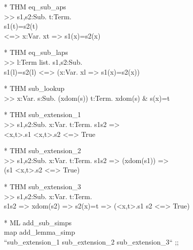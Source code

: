 \begin{prl*}
\>* THM eq\_sub\_aps\\
\>  >> \mforall{}s1,s2:Sub. \mforall{}t:Term. \\
\>      s1(t)=s2(t)\\
\>      <=> \mforall{}x:Var. x\mepsilon{}t => s1(x)=s2(x)
\end{prl*}

\begin{prl*}
\>* THM eq\_sub\_laps\\
\>  >> \mforall{}l:Term list. \mforall{}s1,s2:Sub. \\
\>        s1(l)=s2(l) <=> (\mforall{}x:Var. x\mepsilon{}l => s1(x)=s2(x))
\end{prl*}

\begin{prl*}
\>* THM sub\_lookup\\
\>  >> \mforall{}x:Var. \mforall{}s:Sub. \mneg{}(x\mepsilon{}dom(s)) \mvee{} \mexists{}t:Term. x\mepsilon{}dom(s) \& s(x)=t
\end{prl*}

\begin{prl*}
\>* THM sub\_extension\_1\\
\>  >> \mforall{}s1,s2:Sub. \mforall{}x:Var. \mforall{}t:Term. s1\msubset{}s2 => \\
\>      <x,t>.s1 \msubset{} <x,t>.s2 <=> True
\end{prl*}

\begin{prl*}
\>* THM sub\_extension\_2\\
\>  >> \mforall{}s1,s2:Sub. \mforall{}x:Var. \mforall{}t:Term. s1\msubset{}s2 => \mneg{}(x\mepsilon{}dom(s1)) => \\
\>     (s1 \msubset{} <x,t>.s2 <=> True)
\end{prl*}

\begin{prl*}
\>* THM sub\_extension\_3\\
\>  >> \mforall{}s1,s2:Sub. \mforall{}x:Var. \mforall{}t:Term. \\
\>     s1\msubset{}s2 => x\mepsilon{}dom(s2) => s2(x)=t => (<x,t>.s1 \msubset{} s2 <=> True)
\end{prl*}

\begin{prl*}
\>* ML add\_sub\_simps\\
\>  map add\_lemma\_simp \\
\>  ``sub\_extension\_1 sub\_extension\_2 sub\_extension\_3`` ;;
\end{prl*}

